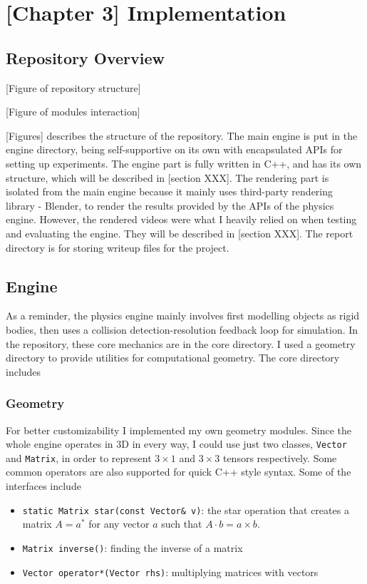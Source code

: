 \documentclass[runningheads]{llncs}
\newcommand{\code}{\texttt}
\begin{document}
\chapter{[Chapter 3] Implementation}

\section{Repository Overview}

[Figure of repository structure]

[Figure of modules interaction]

[Figures] describes the structure of the repository. The main engine is put in the engine directory, being self-supportive on its own with encapsulated APIs for setting up experiments. The engine part is fully written in C++, and has its own structure, which will be described in [section XXX]. The rendering part is isolated from the main engine because it mainly uses third-party rendering library - Blender, to render the results provided by the APIs of the physics engine. However, the rendered videos were what I heavily relied on when testing and evaluating the engine. They will be described in [section XXX]. The report directory is for storing writeup files for the project.

\section{Engine}

As a reminder, the physics engine mainly involves first modelling objects as rigid bodies, then uses a collision detection-resolution feedback loop for simulation. In the repository, these core mechanics are in the core directory. I used a geometry directory to provide utilities for computational geometry. The core directory includes 

\subsection{Geometry}

For better customizability I implemented my own geometry modules. Since the whole engine operates in 3D in every way, I could use just two classes, \code{Vector} and \code{Matrix}, in order to represent $3 \times 1$ and $3 \times 3$ tensors respectively. Some common operators are also supported for quick C++ style syntax. Some of the interfaces include

\begin{itemize}
\item \code{static Matrix star(const Vector\& v)}: the star operation that creates a matrix $A=a^*$ for any vector $a$ such that $A \cdot b = a\times b$.
\item \code{Matrix inverse()}: finding the inverse of a matrix
\item \code{Vector operator*(Vector rhs)}: multiplying matrices with vectors
\end{itemize}
\end{document}

